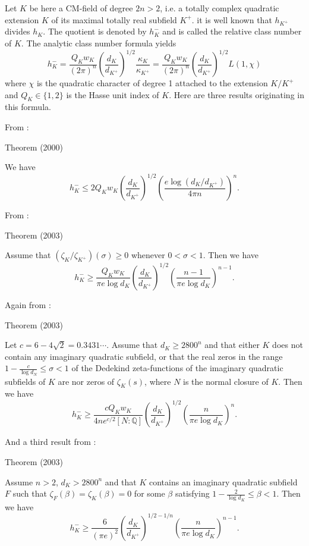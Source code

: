 Let $K$ be here a CM-field of degree $2n > 2$, i.e. a totally complex
quadratic extension $K$ of its maximal totally real subfield $K^+$. it is well
known that $h_{K^+}$ divides $h_K$. The quotient is denoted by $h^-_K$ and is
called the relative class number of $K$. The analytic class number
formula yields
$$
h^-_K=\frac{Q_Kw_K}{(2\pi)^n}
\left(\frac{d_K}{d_{K^+}}\right)^{1/2}
\frac{\kappa_K}{\kappa_{K^+}}
=
\frac{Q_Kw_K}{(2\pi)^n}
\left(\frac{d_K}{d_{K^+}}\right)^{1/2}
L(1,\chi)
$$
where $\chi$ is the quadratic character of degree 1 attached to the extension
$K/K^+$ and $Q_K\in\{1,2\}$ is the Hasse unit index of $K$.
Here are three results originating in this formula.

From \cite{Louboutin*00}:
\begin{thm}{Theorem (2000)}

  We have
  $$
  h^-_K
  \le
  2Q_Kw_K\left(\frac{d_K}{d_{K^+}}\right)^{1/2}
  \left(
  \frac{e\log(d_K/d_{K^+})}{4\pi n}
  \right)^n.
  $$
\end{thm}


From \cite{Louboutin*03}:
\begin{thm}{Theorem (2003)}

  Assume that $(\zeta_K/\zeta_{K^+})(\sigma)\ge0$ whenever $0 < \sigma <
  1$. Then we have
  $$
  h^-_K
  \ge
  \frac{Q_Kw_K}{\pi e \log d_K}
  \left(\frac{d_K}{d_{K^+}}\right)^{1/2}
  \left(
  \frac{n-1}{\pi e\log d_K}
  \right)^{n-1}.
  $$
\end{thm}


Again from \cite{Louboutin*03}:
\begin{thm}{Theorem (2003)}

  Let $c=6-4\sqrt{2}=0.3431\cdots$. Assume that $d_K\ge 2800^n$ and that
  either $K$ does not contain any imaginary quadratic subfield, or that the
  real zeros in the range $1-\frac{c}{\log d_N}\le \sigma < 1$ of the Dedekind
  zeta-functions of the imaginary quadratic subfields of $K$ are nor zeros of
  $\zeta_K(s)$, where $N$ is the normal closure of $K$. Then we have
  $$
  h^-_K
  \ge
  \frac{cQ_Kw_K}{4ne^{c/2}[N:\mathbb{Q}]}
  \left(\frac{d_K}{d_{K^+}}\right)^{1/2}
  \left(
  \frac{n}{\pi e\log d_K}
  \right)^{n}.
  $$
\end{thm}


And a third result from \cite{Louboutin*03}:
\begin{thm}{Theorem (2003)}

  Assume $n > 2$, $d_K > 2800^n$ and that
  $K$ contains an imaginary quadratic subfield $F$ such that
  $\zeta_F(\beta)=\zeta_K(\beta)=0$ for some $\beta$ satisfying
  $1-\frac{2}{\log d_K}\le \beta < 1$.
  Then we have
  $$
  h^-_K
  \ge
  \frac{6}{(\pi e)^2}
  \left(\frac{d_K}{d_{K^+}}\right)^{1/2-1/n}
  \left(
  \frac{n}{\pi e\log d_K}
  \right)^{n-1}.
  $$
\end{thm}






